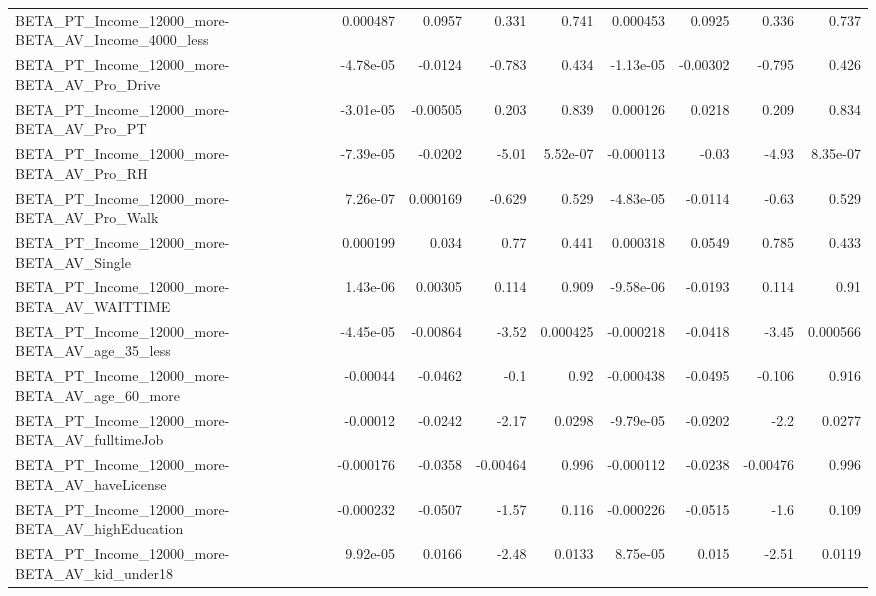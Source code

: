\begin{tabular}{lrrrrrrrr}
BETA\_PT\_Income\_12000\_more-BETA\_AV\_Income\_4000\_less &    0.000487 &       0.0957 &     0.331 &    0.741 &   0.000453 &      0.0925 &        0.336 &         0.737 \\
BETA\_PT\_Income\_12000\_more-BETA\_AV\_Pro\_Drive        &   -4.78e-05 &      -0.0124 &    -0.783 &    0.434 &  -1.13e-05 &    -0.00302 &       -0.795 &         0.426 \\
BETA\_PT\_Income\_12000\_more-BETA\_AV\_Pro\_PT           &   -3.01e-05 &     -0.00505 &     0.203 &    0.839 &   0.000126 &      0.0218 &        0.209 &         0.834 \\
BETA\_PT\_Income\_12000\_more-BETA\_AV\_Pro\_RH           &   -7.39e-05 &      -0.0202 &     -5.01 & 5.52e-07 &  -0.000113 &       -0.03 &        -4.93 &      8.35e-07 \\
BETA\_PT\_Income\_12000\_more-BETA\_AV\_Pro\_Walk         &    7.26e-07 &     0.000169 &    -0.629 &    0.529 &  -4.83e-05 &     -0.0114 &        -0.63 &         0.529 \\
BETA\_PT\_Income\_12000\_more-BETA\_AV\_Single           &    0.000199 &        0.034 &      0.77 &    0.441 &   0.000318 &      0.0549 &        0.785 &         0.433 \\
BETA\_PT\_Income\_12000\_more-BETA\_AV\_WAITTIME         &    1.43e-06 &      0.00305 &     0.114 &    0.909 &  -9.58e-06 &     -0.0193 &        0.114 &          0.91 \\
BETA\_PT\_Income\_12000\_more-BETA\_AV\_age\_35\_less      &   -4.45e-05 &     -0.00864 &     -3.52 & 0.000425 &  -0.000218 &     -0.0418 &        -3.45 &      0.000566 \\
BETA\_PT\_Income\_12000\_more-BETA\_AV\_age\_60\_more      &    -0.00044 &      -0.0462 &      -0.1 &     0.92 &  -0.000438 &     -0.0495 &       -0.106 &         0.916 \\
BETA\_PT\_Income\_12000\_more-BETA\_AV\_fulltimeJob      &    -0.00012 &      -0.0242 &     -2.17 &   0.0298 &  -9.79e-05 &     -0.0202 &         -2.2 &        0.0277 \\
BETA\_PT\_Income\_12000\_more-BETA\_AV\_haveLicense      &   -0.000176 &      -0.0358 &  -0.00464 &    0.996 &  -0.000112 &     -0.0238 &     -0.00476 &         0.996 \\
BETA\_PT\_Income\_12000\_more-BETA\_AV\_highEducation    &   -0.000232 &      -0.0507 &     -1.57 &    0.116 &  -0.000226 &     -0.0515 &         -1.6 &         0.109 \\
BETA\_PT\_Income\_12000\_more-BETA\_AV\_kid\_under18      &    9.92e-05 &       0.0166 &     -2.48 &   0.0133 &   8.75e-05 &       0.015 &        -2.51 &        0.0119 \\

\end{tabular}
